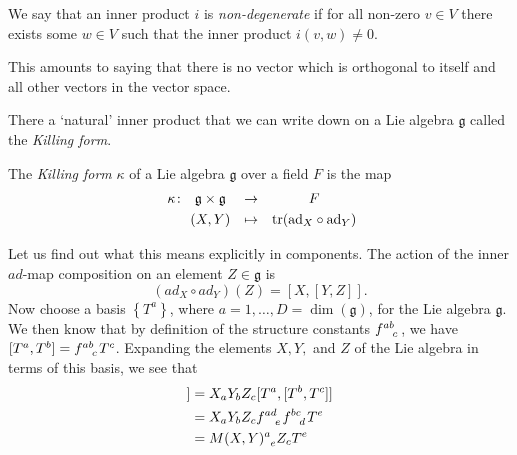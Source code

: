 \begin{definition}
  We say that an inner product $i$ is \emph{non-degenerate} if for all non-zero $v \in V$ there exists some $w \in V$ such that the inner product $i(v, w) \neq 0$.
\end{definition}
\begin{leftbar}
  \begin{remark}
    This amounts to saying that there is no vector which is orthogonal to itself and all other vectors in the vector space.
  \end{remark}
\end{leftbar}
There a `natural' inner product that we can write down on a Lie algebra $\mathfrak{g}$ called the \emph{Killing form}.
\begin{definition}[]
  The \emph{Killing form} $\kappa$ of a Lie algebra $\mathfrak{g}$ over a field $F$ is the map
  \begin{equation}
    \begin{gathered}
      \kappa \colon \\
      \qquad
    \end{gathered}
    \begin{gathered}
      \mathfrak{g} \times \mathfrak{g} \\
      (X, Y)
    \end{gathered}
    \quad
    \begin{gathered}
      \to \\
      \mapsto
    \end{gathered}
    \quad
    \begin{gathered}
      F \\
      \tr(\text{ad}_{X} \circ \text{ad} _{Y})
    \end{gathered}
  \end{equation}
\end{definition}
Let us find out what this means explicitly in components.
The action of the inner $ad$-map composition on an element $Z \in \mathfrak{g}$ is
\begin{equation}
  (ad_X \circ ad_Y)(Z) =  [X,[Y, Z]].
\end{equation}
Now choose a basis $\left\{ T^a \right\}$, where $a = 1, \dots, D=\dim(\mathfrak{g})$, for the Lie algebra $\mathfrak{g}$. 
We then know that by definition of the structure constants $f \indices{^{ab}_c}$, we have $[T^a, T^b] = f \indices{^{ab}_c} T^c$.
Expanding the elements $X, Y,$ and $Z$ of the Lie algebra in terms of this basis, we see that
\begin{align}
  [X, [Y, Z]] &= X_a Y_b Z_c [T^a, [T^b, T^c]] \\
	      &= X_a Y_b Z_c f \indices{^{ad}_e} f \indices{^{bc}_d} T^e \\
	      &= M(X, Y) \indices{^a_e} Z_c T^e
\end{align}
